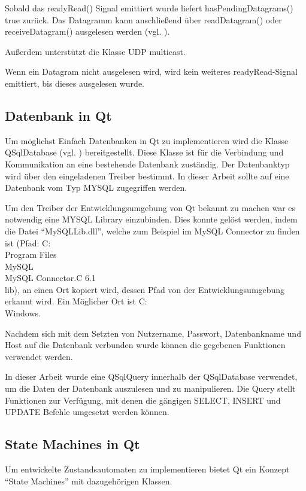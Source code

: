 Sobald das readyRead() Signal emittiert wurde liefert hasPendingDatagrams() true zurück. Das Datagramm kann anschließend über readDatagram() oder receiveDatagram() ausgelesen werden (vgl. \cite{qt_socket}).

Außerdem unterstützt die Klasse UDP multicast.

Wenn ein Datagram nicht ausgelesen wird, wird kein weiteres readyRead-Signal emittiert, bis dieses ausgelesen wurde. 

\subsection{Datenbank in Qt}
\label{sec:QTDatabase}

Um möglichst Einfach Datenbanken in Qt zu implementieren wird die Klasse QSqlDatabase (vgl. \cite{qt_database}) bereitgestellt. Diese Klasse ist für die Verbindung und Kommunikation an eine bestehende Datenbank zuständig. Der Datenbanktyp wird über den eingeladenen Treiber bestimmt. In dieser Arbeit sollte auf eine Datenbank vom Typ MYSQL zugegriffen werden.

Um den Treiber der Entwicklungsumgebung von Qt bekannt zu machen war es notwendig eine MYSQL Library einzubinden. Dies konnte gelöst werden, indem die Datei "`MySQLLib.dll"', welche zum Beispiel im MySQL Connector zu finden ist (Pfad: C:\\Program Files\\MySQL\\MySQL Connector.C 6.1\\lib), an einen Ort kopiert wird, dessen Pfad von der Entwicklungsumgebung erkannt wird. Ein Möglicher Ort ist C:\\Windows. 

Nachdem sich mit dem Setzten von Nutzername, Passwort, Datenbankname und Host auf die Datenbank verbunden wurde können die gegebenen Funktionen verwendet werden. 

In dieser Arbeit wurde eine QSqlQuery innerhalb der QSqlDatabase verwendet, um die Daten der Datenbank auszulesen und zu manipulieren. Die Query stellt Funktionen zur Verfügung, mit denen die gängigen SELECT, INSERT und UPDATE Befehle umgesetzt werden können.  

\subsection{State Machines in Qt}
\label{sec:StateMachines}

Um entwickelte Zustandsautomaten zu implementieren bietet Qt ein Konzept "`State Machines"' mit dazugehörigen Klassen. 

